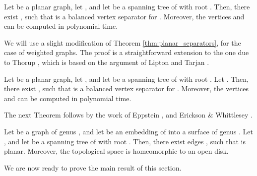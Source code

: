 \documentclass[envcountsect]{llncs}
\begin{document}
\begin{theorem}\label{thm:planar_separators}
Let  be a planar graph, let , and let  be a spanning tree of  with root .
Then, there exist , such that  is a balanced vertex separator for .
Moreover, the vertices  and  can be computed in polynomial time.
\end{theorem}

We will use a slight modification of Theorem \ref{thm:planar_separators}, for the case of weighted graphs.
The proof is a straightforward extension to the one due to Thorup \cite{thorup2004compact}, which is based on the argument of Lipton and Tarjan \cite{lipton1979separator}.

\begin{lemma}\label{lem:weighted_planar_separators}
Let  be a planar graph, let , and let  be a spanning tree of  with root .
Let .
Then, there exist , such that  is a balanced vertex separator for .
Moreover, the vertices  and  can be computed in polynomial time.
\end{lemma}

The next Theorem follows by the work of Eppstein \cite{eppstein2003dynamic}, and Erickson \& Whittlesey \cite{erickson2005greedy}.

\begin{theorem}\label{thm:planarization_spanning}
Let  be a graph of genus , and let  be an embedding of  into a surface  of genus .
Let , and let  be a spanning tree of  with root .
Then, there exist edges , such that
 is planar.
Moreover, the topological space  is homeomorphic to an open disk.
\end{theorem}

We are now ready to prove the main result of this section.
\end{document}
